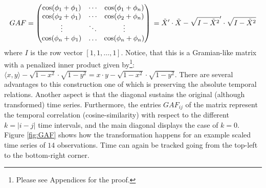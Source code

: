 \documentclass[12pt, a4paper]{article}
\begin{document}
\begin{equation}
\label{eq:GAF}
    GAF =\begin{pmatrix} 
\cos(\phi_1 + \phi_1) & \cdots & \cos(\phi_1 + \phi_n)\\
\cos(\phi_2 + \phi_1) & \cdots & \cos(\phi_2 + \phi_n)\\
\vdots & \ddots & \vdots\\
\cos(\phi_n + \phi_1) & \dots & \cos(\phi_n + \phi_n)\\
\end{pmatrix} \\
= \Tilde{X}' \cdot \Tilde{X} - \sqrt{I-\Tilde{X}^2}' \cdot \sqrt{I-\Tilde{X}^2}
\end{equation}
where $I$ is the row vector $[1, 1, \dots, 1]$. Notice, that this is a Gramian-like matrix with a penalized inner product given by\footnote{Please see Appendices  for the proof.}: $\langle x, y\rangle - \sqrt{1-x^2} \cdot \sqrt{1-y^2}= x \cdot y - \sqrt{1-x^2} \cdot \sqrt{1-y^2}$. There are several advantages to this construction one of which is preserving the absolute temporal relations. Another aspect is that the diagonal sustains the original (although transformed) time series. Furthermore, the entries $GAF_{ij}$ of the matrix represent the temporal correlation (cosine-similarity) with respect to the different $k= |i-j|$ time intervals, and the main diagonal displays the case of $k=0$. Figure \ref{fig:GAF} shows how the transformation happens for an example scaled time series of $14$ observations. Time can again be tracked going from the top-left to the bottom-right corner.
\end{document}
